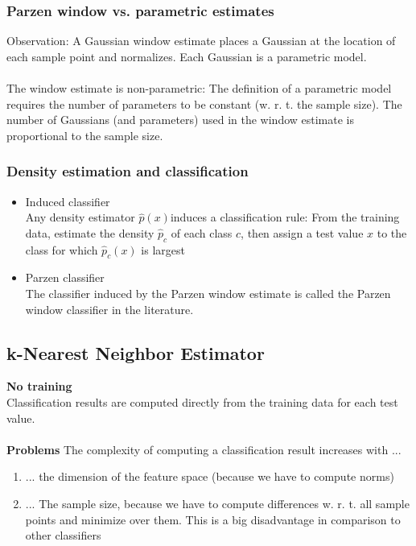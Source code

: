 \documentclass[main]{subfiles}
\begin{document}
\subsubsection{Parzen window vs. parametric estimates}
Observation: A Gaussian window estimate places a Gaussian
at the location of each sample point and
normalizes. Each Gaussian is a parametric model.\\\\
The window estimate is non-parametric: The definition of a
parametric model requires the number of
parameters to be constant (w. r. t. the sample
size). The number of Gaussians (and parameters)
used in the window estimate is proportional to the
sample size.


\subsubsection{Density estimation and classification}
\begin{itemize}
\item Induced classifier\\
 Any density estimator $\hat{p}(x)$induces a
classification rule: From the training data, estimate
the density $\hat{p}_c$ of each class $c$, then assign a test
value $x$ to the class for which $\hat{p}_c(x)$ is largest
\item Parzen classifier\\
The classifier induced by the Parzen window
estimate is called the Parzen window classifier in
the literature.


\end{itemize}


\subsection{k-Nearest Neighbor Estimator}
\textbf{No training}\\
Classification results are computed directly from
the training data for each test value.\\\\
\textbf{Problems} The complexity of computing a classification result
increases with ...
\begin{enumerate}
\item ... the dimension of the feature space
(because we have to compute norms)
\item ... The sample size, because we have to
compute differences w. r. t. all sample points
and minimize over them. This is a big
disadvantage in comparison to other
classifiers
\end{enumerate}
\end{document}
